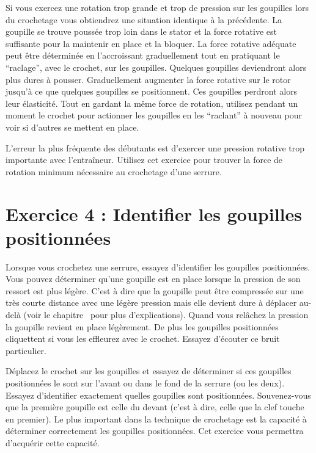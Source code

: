 \documentclass[a4paper,french,11pt,twoside]{report}
\begin{document}
Si vous exercez une rotation trop grande et trop de pression sur les goupilles lors du crochetage vous obtiendrez une situation identique à la précédente. La goupille se trouve poussée trop loin dans le stator et la force rotative est suffisante pour la maintenir en place et la bloquer. La force rotative adéquate peut être déterminée en l'accroissant graduellement tout en pratiquant le \enquote{raclage}, avec le crochet, sur les goupilles. Quelques goupilles deviendront alors plus dures à pousser. Graduellement augmenter la force rotative sur le rotor jusqu'à ce que quelques goupilles se positionnent. Ces goupilles perdront alors leur élasticité. Tout en gardant la même force de rotation, utilisez pendant un moment le crochet pour actionner les goupilles en les \enquote{raclant} à nouveau pour voir si d'autres se mettent en place.

L'erreur la plus fréquente des débutants est d'exercer une pression rotative trop importante avec l'entraîneur. Utilisez cet exercice pour trouver la force de rotation minimum nécessaire au crochetage d'une serrure.

\section{Exercice 4 : Identifier les goupilles positionnées}

Lorsque vous crochetez une serrure, essayez d'identifier les goupilles positionnées. Vous pouvez déterminer qu'une goupille est en place lorsque la pression de son ressort est plus légère. C'est à dire que la goupille peut être compressée sur une très courte distance avec une légère pression mais elle devient dure à déplacer au-delà (voir le chapitre~ pour plus d'explications). Quand vous relâchez la pression la goupille revient en place légèrement. De plus les goupilles positionnées cliquettent si vous les effleurez avec le crochet. Essayez d'écouter ce bruit particulier.

Déplacez le crochet sur les goupilles et essayez de déterminer si ces goupilles positionnées le sont sur l'avant ou dans le fond de la serrure (ou les deux). Essayez d'identifier exactement quelles goupilles sont positionnées. Souvenez-vous que la première goupille est celle du devant (c'est à dire, celle que la clef touche en premier). Le plus important dans la technique de crochetage est la capacité à déterminer correctement les goupilles positionnées. Cet exercice vous permettra d'acquérir cette capacité.
\end{document}
